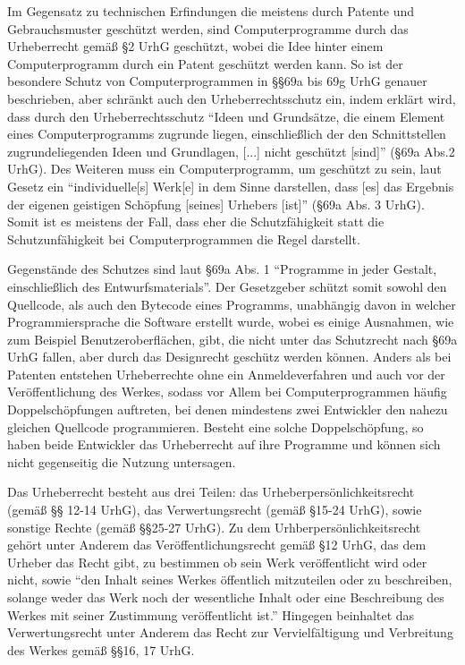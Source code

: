 Im Gegensatz zu technischen Erfindungen die meistens durch Patente und Gebrauchsmuster geschützt werden, sind Computerprogramme durch das Urheberrecht gemäß §2 UrhG geschützt,
wobei die Idee hinter einem Computerprogramm durch ein Patent geschützt werden kann. So ist der besondere Schutz von Computerprogrammen in §§69a bis 69g UrhG genauer beschrieben,
aber schränkt auch den Urheberrechtsschutz ein, indem erklärt wird, dass durch den Urheberrechtsschutz “Ideen und Grundsätze, die einem Element eines Computerprogramms zugrunde liegen, einschließlich der den Schnittstellen zugrundeliegenden Ideen und Grundlagen,
[...] nicht geschützt [sind]” (§69a Abs.2 UrhG).  Des Weiteren muss ein Computerprogramm, um geschützt zu sein, laut Gesetz ein “individuelle[s] Werk[e] in dem Sinne darstellen,
dass [es] das Ergebnis der eigenen geistigen Schöpfung [seines] Urhebers [ist]” (§69a Abs. 3 UrhG). Somit ist es meistens der Fall, dass eher die Schutzfähigkeit statt die Schutzunfähigkeit bei Computerprogrammen die Regel darstellt.

Gegenstände des Schutzes sind laut §69a Abs. 1 “Programme in jeder Gestalt, einschließlich des Entwurfsmaterials”. Der Gesetzgeber schützt somit sowohl den Quellcode,
als auch den Bytecode eines Programms, unabhängig davon in welcher Programmiersprache die Software erstellt wurde, wobei es einige Ausnahmen, wie zum Beispiel Benutzeroberflächen, gibt,
die nicht unter das Schutzrecht nach §69a UrhG fallen, aber durch das Designrecht geschütz werden können. Anders als bei Patenten entstehen Urheberrechte ohne ein Anmeldeverfahren und auch vor der Veröffentlichung des Werkes,
sodass vor Allem bei Computerprogrammen häufig Doppelschöpfungen auftreten, bei denen mindestens zwei Entwickler den nahezu gleichen Quellcode programmieren.
Besteht eine solche Doppelschöpfung, so haben beide Entwickler das Urheberrecht auf ihre Programme und können sich nicht gegenseitig die Nutzung untersagen. 

Das Urheberrecht besteht aus drei Teilen: das Urheberpersönlichkeitsrecht (gemäß §§ 12-14 UrhG), das Verwertungsrecht (gemäß §15-24 UrhG), sowie sonstige Rechte (gemäß §§25-27 UrhG).
Zu dem Urhberpersönlichkeitsrecht gehört unter Anderem das Veröffentlichungsrecht gemäß §12 UrhG, das dem Urheber das Recht gibt, zu bestimmen ob sein Werk veröffentlicht wird oder nicht,
sowie “den Inhalt seines Werkes öffentlich mitzuteilen oder zu beschreiben, solange weder das Werk noch der wesentliche Inhalt oder eine Beschreibung des Werkes mit seiner
Zustimmung veröffentlicht ist.” Hingegen beinhaltet das Verwertungsrecht unter Anderem das Recht zur Vervielfältigung und Verbreitung des Werkes gemäß §§16, 17 UrhG.

